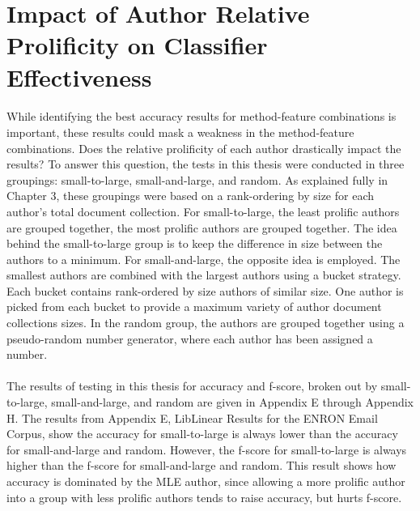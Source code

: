 \section{Impact of Author Relative Prolificity on Classifier Effectiveness}
	\paragraph*{} While identifying the best accuracy results for method-feature combinations is important, these results could mask a weakness in the method-feature combinations.  Does the relative prolificity of each author drastically impact the results?  To answer this question, the tests in this thesis were conducted in three groupings: small-to-large, small-and-large, and random.  As explained fully in Chapter 3, these groupings were based on a rank-ordering by size for each author's total document collection.  For small-to-large, the least prolific authors are grouped together, the most prolific authors are grouped together. The idea behind the small-to-large group is to keep the difference in size between the authors to a minimum. For small-and-large, the opposite idea is employed.  The smallest authors are combined with the largest authors using a bucket strategy.  Each bucket contains rank-ordered by size authors of similar size.  One author is picked from each bucket to provide a maximum variety of author document collections sizes.  In the random group, the authors are grouped together using a pseudo-random number generator, where each author has been assigned a number.
	\paragraph*{} The results of testing in this thesis for accuracy and f-score, broken out by small-to-large, small-and-large, and random are given in Appendix E through Appendix H.  The results from Appendix E, LibLinear Results for the ENRON Email Corpus, show the accuracy for small-to-large is always lower than the accuracy for small-and-large and random.  However, the f-score for small-to-large is always higher than the f-score for small-and-large and random.  This result shows how accuracy is dominated by the MLE author, since allowing a more prolific author into a group with less prolific authors tends to raise accuracy, but hurts f-score. %

